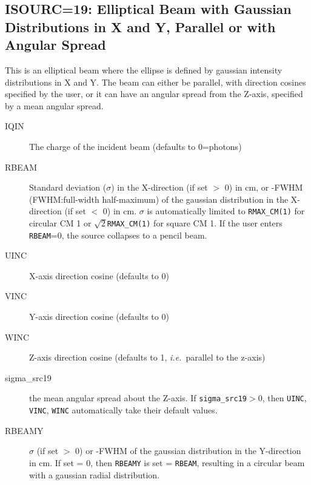 \documentclass[12pt,twoside]{article}
\newcommand{\ie}{{\em i.e.}}
\begin{document}
\subsection{ISOURC=19: Elliptical Beam with Gaussian Distributions in X and Y, Parallel or with Angular Spread}
\label{isourc19}
  
\vspace*{-0.3cm}
This is an elliptical beam where the ellipse is defined by gaussian intensity distributions
in X and Y.  The beam can either be parallel, with direction cosines
specified by the user, or it can have an angular spread from the Z-axis,
specified by a mean angular spread.
\vspace*{-0.3cm}
\begin{description}
\item [IQIN] The charge of the incident beam (defaults to 0=photons)
\vspace*{-0.2cm}
\item [RBEAM] Standard deviation ($\sigma$) in the X-direction
(if set $>$ 0) in cm, or
-FWHM (FWHM:full-width half-maximum) of the gaussian distribution in the X-direction (if set $<$ 0) in cm.
$\sigma$ is automatically limited to {\tt RMAX\_CM(1)} for circular CM 1 or
$\sqrt{2}${\tt RMAX\_CM(1)} for square CM 1.  If
the user enters {\tt RBEAM}=0, the source collapses to a pencil beam.
\vspace*{-0.2cm}
\item [UINC] X-axis direction cosine (defaults to 0)
\vspace*{-0.2cm}
\item [VINC] Y-axis direction cosine (defaults to 0)
\vspace*{-0.2cm}
\item [WINC] Z-axis direction cosine (defaults to 1, \ie\ parallel to
the z-axis)
\vspace*{-0.2cm}
\item [sigma\_src19] the mean angular spread about the Z-axis.  If
{\tt sigma\_src19}$>$0, then {\tt UINC}, {\tt VINC}, {\tt WINC} automatically
take their default values.
\item [RBEAMY] $\sigma$ (if set $>$ 0) or -FWHM of the gaussian distribution in the
Y-direction in cm.  If set = 0, then {\tt RBEAMY} is set = {\tt RBEAM}, resulting in a circular
beam with a gaussian radial distribution.
\end{description}
\vspace*{-0.3cm}
\end{document}
